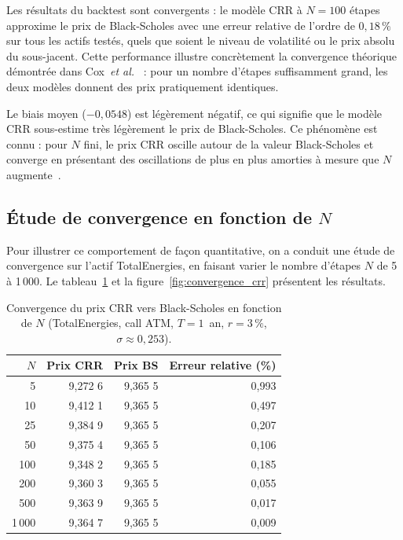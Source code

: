 \documentclass[11pt]{report}
\begin{document}
Les résultats du backtest sont convergents : le modèle CRR à $N = 100$
étapes approxime le prix de Black-Scholes avec une erreur relative
de l'ordre de $0{,}18\,\%$ sur tous les actifs testés, quels que soient
le niveau de volatilité ou le prix absolu du sous-jacent. Cette performance
illustre concrètement la convergence théorique démontrée dans
Cox~\textit{et al.}~\cite{crr1979} : pour un nombre d'étapes suffisamment
grand, les deux modèles donnent des prix pratiquement identiques.

Le biais moyen ($-0{,}0548$) est légèrement négatif, ce qui signifie que
le modèle CRR sous-estime très légèrement le prix de Black-Scholes. Ce
phénomène est connu : pour $N$ fini, le prix CRR oscille autour de la
valeur Black-Scholes et converge en présentant des oscillations de plus
en plus amorties à mesure que $N$ augmente~\cite{hull2018}.

\subsection{Étude de convergence en fonction de $N$}

Pour illustrer ce comportement de façon quantitative, on a conduit une
étude de convergence sur l'actif TotalEnergies, en faisant varier le
nombre d'étapes $N$ de 5 à 1\,000. Le tableau~\ref{tab:convergence}
et la figure~\ref{fig:convergence_crr} présentent les résultats.

\begin{table}[H]
\centering
\caption{Convergence du prix CRR vers Black-Scholes en fonction de $N$
         (TotalEnergies, call ATM, $T=1$~an, $r=3\,\%$, $\sigma \approx 0{,}253$).}
\label{tab:convergence}
\begin{tabular}{rrrr}
\toprule
$N$ & Prix CRR & Prix BS & Erreur relative (\%) \\
\midrule
    5 & 9,272 6 & 9,365 5 & 0,993 \\
   10 & 9,412 1 & 9,365 5 & 0,497 \\
   25 & 9,384 9 & 9,365 5 & 0,207 \\
   50 & 9,375 4 & 9,365 5 & 0,106 \\
  100 & 9,348 2 & 9,365 5 & 0,185 \\
  200 & 9,360 3 & 9,365 5 & 0,055 \\
  500 & 9,363 9 & 9,365 5 & 0,017 \\
1\,000 & 9,364 7 & 9,365 5 & 0,009 \\
\bottomrule
\end{tabular}
\end{table}
\end{document}

